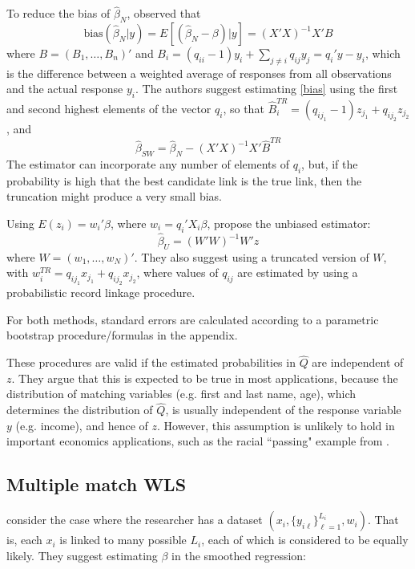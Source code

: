 \documentclass[12pt]{article}
\begin{document}
To reduce the bias of $\hat{\beta}_N$, \cite{sw1993} observed that 
\begin{equation} \text{bias} (\hat{\beta}_N | y) = E[(\hat{\beta}_N - \beta) | y ] = (X'X)^{-1} X'B \label{bias} \end{equation}
where $B = (B_1, \dots, B_n)'$ and $B_i = (q_{ii}-1)y_i + \sum_{j\neq i } q_{ij} y_j = q_i'y - y_i$, which is the difference between a weighted average of responses from all observations and the actual response $y_i$.  The authors suggest estimating \ref{bias} using the first and second highest elements of the vector $q_i$, so that $\hat{B}_i^{TR} = (q_{ij_1} - 1) z_{j_1} + q_{ij_2} z_{j_2}$, and 
\begin{equation} \hat{\beta}_{SW} = \hat{\beta}_N - (X'X)^{-1} X' \hat{B}^{TR} \label{sw}\end{equation}
The estimator can incorporate any number of elements of $q_i$, but, if the probability is high that the best candidate link is the true link, then the truncation might produce a very small bias. 

Using $E(z_i) = w_i'\beta$, where $w_i = q_i'X_i\beta$, \cite{lahiri05} propose the unbiased estimator:
$$ \hat{\beta}_U = (W'W)^{-1} W'z$$ 
where $W = (w_1, \dots, w_N)'$.  They also suggest using a truncated version of $W$, with $w_i^{TR} = q_{ij_1} x_{j_1} + q_{ij_2} x_{j_2}$, where values of $q_{ij}$ are estimated by using a probabilistic record linkage procedure.  

For both methods, standard errors are calculated according to a parametric bootstrap procedure/formulas in the appendix. 

These procedures are valid if the estimated probabilities in $\hat{Q}$ are independent of $z$.  They argue that this is expected to be true in most applications, because the distribution of matching variables (e.g. first and last name, age), which determines the distribution of $\hat{Q}$, is usually independent of the response variable $y$ (e.g. income), and hence of $z$.  However, this assumption is unlikely to hold in important economics applications, such as the racial ``passing" example from \cite{nq2015}. 

\subsection{Multiple match WLS}

\cite{ahl2019} consider the case where the researcher has a dataset $(x_i, \{y_{i\ell}\}_{\ell=1}^{L_i}, w_i)$.  That is, each $x_i$ is linked to many possible $L_i$, each of which is considered to be equally likely.  They suggest estimating $\beta$ in the smoothed regression:
\end{document}
